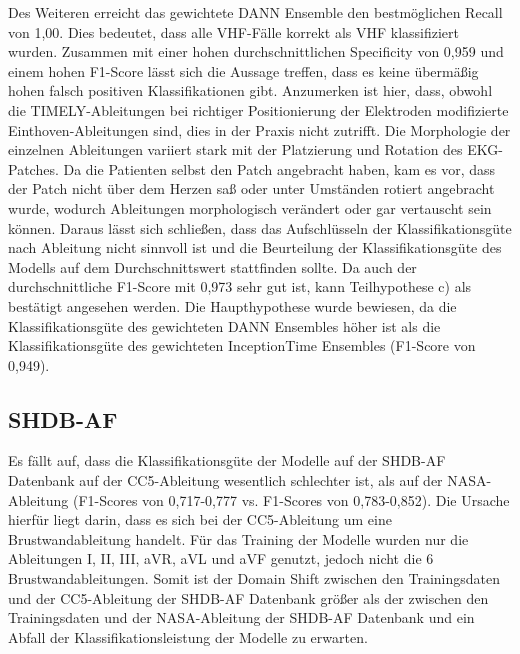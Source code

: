 Des Weiteren erreicht das gewichtete \gls{DANN} Ensemble den bestmöglichen Recall von 1,00. Dies bedeutet, dass alle \gls{VHF}-Fälle korrekt als \gls{VHF} klassifiziert wurden. Zusammen mit einer hohen durchschnittlichen Specificity von 0,959 und einem hohen F1-Score lässt sich die Aussage treffen, dass es keine übermäßig hohen falsch positiven Klassifikationen gibt. 
Anzumerken ist hier, dass, obwohl die TIMELY-Ableitungen bei richtiger Positionierung der Elektroden modifizierte Einthoven-Ableitungen sind, dies in der Praxis nicht zutrifft. Die Morphologie der einzelnen Ableitungen variiert stark mit der Platzierung und Rotation des \gls{EKG}-Patches. Da die Patienten selbst den Patch angebracht haben, kam es vor, dass der Patch nicht über dem Herzen saß oder unter Umständen rotiert angebracht wurde, wodurch Ableitungen morphologisch verändert oder gar vertauscht sein können. Daraus lässt sich schließen, dass das Aufschlüsseln der Klassifikationsgüte nach Ableitung nicht sinnvoll ist und die Beurteilung der Klassifikationsgüte des Modells auf dem Durchschnittswert stattfinden sollte. Da auch der durchschnittliche F1-Score mit 0,973 sehr gut ist, kann Teilhypothese c) als bestätigt angesehen werden. Die Haupthypothese wurde bewiesen, da die Klassifikationsgüte des gewichteten \gls{DANN} Ensembles höher ist als die Klassifikationsgüte des gewichteten InceptionTime Ensembles (F1-Score von 0,949).

\subsection*{SHDB-AF}
Es fällt auf, dass die Klassifikationsgüte der Modelle auf der \gls{SHDB-AF} Datenbank auf der CC5-Ableitung wesentlich schlechter ist, als auf der NASA-Ableitung (F1-Scores von 0,717-0,777 vs. F1-Scores von 0,783-0,852). Die Ursache hierfür liegt darin, dass es sich bei der CC5-Ableitung um eine Brustwandableitung handelt. Für das Training der Modelle wurden nur die Ableitungen I, II, III, aVR, aVL und aVF genutzt, jedoch nicht die 6 Brustwandableitungen. Somit ist der Domain Shift zwischen den Trainingsdaten und der CC5-Ableitung der \gls{SHDB-AF} Datenbank größer als der zwischen den Trainingsdaten und der NASA-Ableitung der \gls{SHDB-AF} Datenbank und ein Abfall der Klassifikationsleistung der Modelle zu erwarten.

